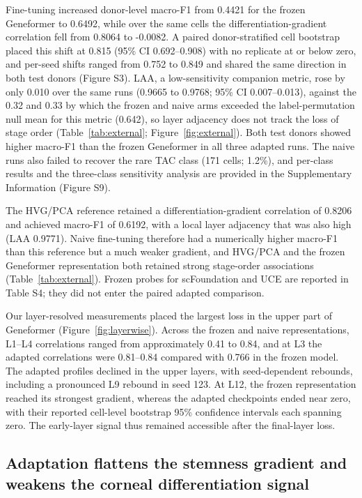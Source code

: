 \documentclass[12pt,letterpaper]{article}
\begin{document}
Fine-tuning increased donor-level macro-F1 from 0.4421 for the frozen Geneformer to 0.6492, while over the same cells the differentiation-gradient correlation fell from 0.8064 to -0.0082. A paired donor-stratified cell bootstrap placed this shift at 0.815 (95\% CI 0.692--0.908) with no replicate at or below zero, and per-seed shifts ranged from 0.752 to 0.849 and shared the same direction in both test donors (Figure S3). LAA, a low-sensitivity companion metric, rose by only 0.010 over the same runs (0.9665 to 0.9768; 95\% CI 0.007--0.013), against the 0.32 and 0.33 by which the frozen and naive arms exceeded the label-permutation null mean for this metric (0.642), so layer adjacency does not track the loss of stage order (Table~\ref{tab:external}; Figure~\ref{fig:external}). Both test donors showed higher macro-F1 than the frozen Geneformer in all three adapted runs. The naive runs also failed to recover the rare TAC class (171 cells; 1.2\%), and per-class results and the three-class sensitivity analysis are provided in the Supplementary Information (Figure S9).

The HVG/PCA reference retained a differentiation-gradient correlation of 0.8206 and achieved macro-F1 of 0.6192, with a local layer adjacency that was also high (LAA 0.9771). Naive fine-tuning therefore had a numerically higher macro-F1 than this reference but a much weaker gradient, and HVG/PCA and the frozen Geneformer representation both retained strong stage-order associations (Table~\ref{tab:external}). Frozen probes for scFoundation and UCE are reported in Table S4; they did not enter the paired adapted comparison.

Our layer-resolved measurements placed the largest loss in the upper part of Geneformer (Figure~\ref{fig:layerwise}). Across the frozen and naive representations, L1--L4 correlations ranged from approximately 0.41 to 0.84, and at L3 the adapted correlations were 0.81--0.84 compared with 0.766 in the frozen model. The adapted profiles declined in the upper layers, with seed-dependent rebounds, including a pronounced L9 rebound in seed 123. At L12, the frozen representation reached its strongest gradient, whereas the adapted checkpoints ended near zero, with their reported cell-level bootstrap 95\% confidence intervals each spanning zero. The early-layer signal thus remained accessible after the final-layer loss.

\subsection*{Adaptation flattens the stemness gradient and weakens the corneal differentiation signal}
\end{document}
